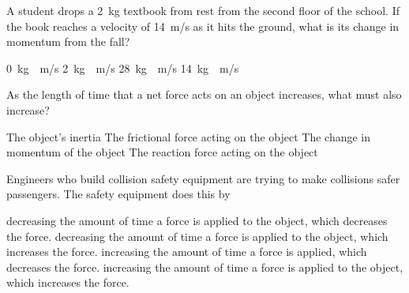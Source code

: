 \documentclass[answers]{exam}
\begin{document}
\begin{questions}
{\color{white} \tiny \vspace{-3em}
\begin{randomizeoneparchoices}[norandomize]
    \correctchoice \phantom{Graph A}
    \choice \phantom{Graph B}
    \choice \phantom{Graph C}
    \choice \phantom{Graph D}
\end{randomizeoneparchoices}
}

\question 
A student drops a \SI{2}{kg} textbook from rest from the second floor of the school. If the book reaches a velocity of \SI{14}{m/s} as it hits the ground, what is its change in momentum from the fall?

\begin{randomizechoices}[norandomize]
    \choice \SI{0}{kg\cdot m/s}
    \choice \SI{2}{kg\cdot m/s}
    \correctchoice \SI{28}{kg\cdot m/s}
    \choice \SI{14}{kg\cdot m/s}
\end{randomizechoices}

\question 
As the length of time 
that a net force acts on an object increases, what must also increase?

\begin{randomizechoices}[norandomize]
    \choice The object's inertia
    \choice The frictional force acting on the object
    \correctchoice The change in momentum of the object
    \choice The reaction force acting on the object
\end{randomizechoices}




\question
Engineers who build collision safety equipment are trying to make collisions safer passengers. The safety equipment does this by

\begin{randomizechoices}[norandomize]
    \choice decreasing the amount of time a force is applied to the object, which decreases the force.
    \choice decreasing the amount of time a force is applied to the object, which increases the force.
    \correctchoice increasing the amount of time a force is applied, which decreases the force.
    \choice increasing the amount of time a force is applied to the object, which increases the force.
\end{randomizechoices}


\end{questions}
\end{document}
